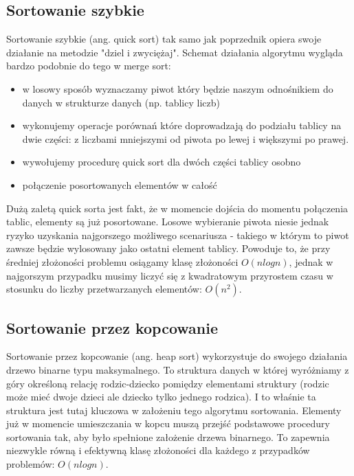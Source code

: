 \documentclass[10pt,a4paper]{article} %
\begin{document}
	\subsection{Sortowanie szybkie}
	Sortowanie szybkie (ang. quick sort) tak samo jak poprzednik opiera swoje działanie na metodzie "dziel i zwyciężaj". Schemat działania algorytmu wygląda bardzo podobnie do tego w merge sort:
	\begin{itemize}
		\item w losowy sposób wyznaczamy piwot który będzie naszym odnośnikiem do danych w strukturze danych (np. tablicy liczb)
		\item wykonujemy operacje porównań które doprowadzają do podziału tablicy na dwie części: z liczbami mniejszymi od piwota po lewej i większymi po prawej.
		\item wywołujemy procedurę quick sort dla dwóch części tablicy osobno
		\item połączenie posortowanych elementów w całość
	\end{itemize}
	Dużą zaletą quick sorta jest fakt, że w momencie dojścia do momentu połączenia tablic, elementy są już posortowane. Losowe wybieranie piwota niesie jednak ryzyko uzyskania najgorszego możliwego scenariusza - takiego w którym to piwot zawsze będzie wylosowany jako ostatni element tablicy. Powoduje to, że przy średniej złożoności problemu osiągamy klasę złożoności $ O (n log n) $, jednak w najgorszym przypadku musimy liczyć się z kwadratowym przyrostem czasu w stosunku do liczby przetwarzanych elementów: $ O (n^2) $.
	\subsection{Sortowanie przez kopcowanie}
	Sortowanie przez kopcowanie (ang. heap sort) wykorzystuje do swojego działania drzewo binarne typu maksymalnego. To struktura danych w której wyróżniamy z góry określoną relację rodzic-dziecko pomiędzy elementami struktury (rodzic może mieć dwoje dzieci ale dziecko tylko jednego rodzica). I to właśnie ta struktura jest tutaj kluczowa w założeniu tego algorytmu sortowania. Elementy już w momencie umieszczania w kopcu muszą przejść podstawowe procedury sortowania tak, aby było spełnione założenie drzewa binarnego. To zapewnia niezwykle równą i efektywną klasę złożoności dla każdego z przypadków problemów: $ O (n log n) $.
	\clearpage
	
\end{document}
